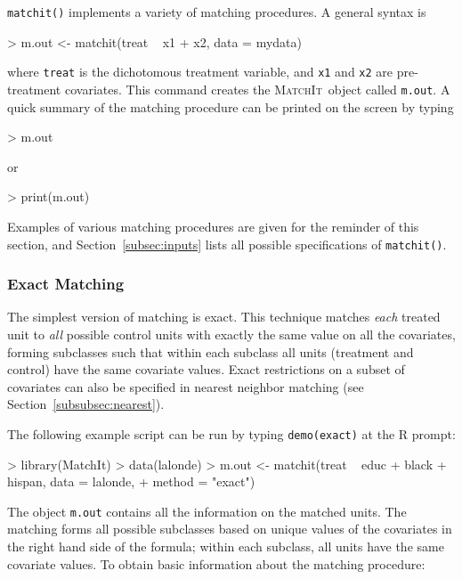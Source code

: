 \documentclass[oneside,letterpaper,titlepage]{article}
\newcommand{\MatchIt}{\textsc{MatchIt}}
\begin{document}
\texttt{matchit()} implements a variety of matching procedures.  A
general syntax is
\begin{Schunk}
\begin{Sinput}
> m.out <- matchit(treat ~ x1 + x2, data = mydata)
\end{Sinput}
\end{Schunk}
where {\tt treat} is the dichotomous treatment variable, and {\tt x1}
and {\tt x2} are pre-treatment covariates.  This command creates the
\MatchIt\ object called \texttt{m.out}.  A quick summary of the
matching procedure can be printed on the screen by typing
\begin{Schunk}
\begin{Sinput}
> m.out
\end{Sinput}
\end{Schunk}
or
\begin{Schunk}
\begin{Sinput}
> print(m.out)
\end{Sinput}
\end{Schunk}
Examples of various matching procedures are given for the reminder of
this section, and Section~\ref{subsec:inputs} lists all possible
specifications of {\tt matchit()}.

\subsubsection{Exact Matching}
\label{subsubsec:exact}

The simplest version of matching is exact.  This technique matches
\emph{each} treated unit to \emph{all} possible control units with
exactly the same value on all the covariates, forming subclasses such
that within each subclass all units (treatment and control) have the
same covariate values.  Exact restrictions on a subset of covariates
can also be specified in nearest neighbor matching (see
Section~\ref{subsubsec:nearest}).

The following example script can be run by typing {\tt demo(exact)} at
the R prompt:

\begin{Schunk}
\begin{Sinput}
> library(MatchIt)
> data(lalonde)
> m.out <- matchit(treat ~ educ + black + hispan, data = lalonde, 
+     method = "exact")
\end{Sinput}
\end{Schunk}

The object \texttt{m.out} contains all the information on the matched
units.  The matching forms all possible subclasses based on unique
values of the covariates in the right hand side of the formula; within
each subclass, all units have the same covariate values.  To obtain
basic information about the matching procedure:
\end{document}
